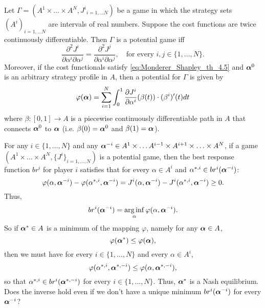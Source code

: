 \begin{theorem}
	Let $\Gamma = (A^1 \times \ldots \times A^N, {J^i}_{i=1,\ldots N})$ be a game in which the strategy sets $(A^i)_{i=1,\ldots N}$ are intervals of real numbers. Suppose the cost functions are twice continuously differentiable. Then $\Gamma$ is a potential game iff
	\begin{equation}
		\frac{\partial^2 J^i}{\partial \alpha^i \partial \alpha^j} =\frac{\partial^2 J^j}{\partial \alpha^i \partial \alpha^j}, \quad \text{for every } i,j \in \{1,\ldots,N\}.
	\label{eq:Monderer_Shapley_th_4.5}
	\end{equation} 
	Moreover, if the cost functionals satisfy \eqref{eq:Monderer_Shapley_th_4.5} and $\boldsymbol{\alpha}^0$ is an arbitrary strategy profile in $A$, then a potential for $\Gamma$ is given by
	\begin{equation}
		\varphi(\boldsymbol{\alpha}) = \sum_{i=1}^N \int_0^1 \frac{\partial J^i}{\partial \alpha^i} (\beta(t)) \cdot (\beta^i)'(t) dt
	\end{equation}
	where $\beta: [0,1] \to A$ is a piecewise continuously differentiable path in $A$ that connects $\boldsymbol{\alpha}^0$ to $\boldsymbol{\alpha}$ (i.e. $\beta(0)=\boldsymbol{\alpha}^0$ and $\beta(1) = \boldsymbol{\alpha}$).\\
\end{theorem}


For any $i \in \{1,\ldots, N\}$ and any $\boldsymbol{\alpha}^{-i} \in  A^{1} \times \ldots A^{i-1} \times A^{i+1} \times \ldots \times A^N$, if a game $( A^{1} \times \ldots \times A^N, \{J^i\}_{i=1,\ldots,N})$ is a potential game, then the best response function $br^i$ for player $i$ satisfies that for every $\alpha \in A^i$ and $\alpha^{*,i} \in br^{i}(\boldsymbol{\alpha}^{-i})$:
\begin{equation}
	\varphi(\alpha, \boldsymbol{\alpha}^{-i}) - \varphi(\alpha^{*,i}, \boldsymbol{\alpha}^{-i}) = J^{i}(\alpha, \boldsymbol{\alpha}^{-i}) - J^i(\alpha^{*,i}, \boldsymbol{\alpha}^{-i}) \geq 0.
\end{equation}
Thus, 
$$
	br^{i}(\boldsymbol{\alpha}^{-i}) = \operatorname*{arg\,inf}_{\alpha} \varphi(\alpha, \boldsymbol{\alpha}^{-i}).
$$
So if $\boldsymbol{\alpha}^* \in A$ is a minimum of the mapping $\varphi$, namely for any $\boldsymbol{\alpha} \in A$,
$$
	\varphi(\boldsymbol{\alpha}^*) \leq \varphi(\boldsymbol{\alpha}),
$$
then we must have for every $i \in \{1,\ldots,N\}$ and every $\alpha \in A^i$,
$$
	\varphi(\alpha^{*,i}, \boldsymbol{\alpha}^{*,-i}) \leq \varphi(\alpha, \boldsymbol{\alpha}^{*,-i}),
$$
so that $\alpha^{*,i} \in br^{i}(\boldsymbol{\alpha}^{*,-i})$ for every $i \in \{1,\ldots,N\}$. Thus, $\boldsymbol{\alpha}^*$ is a Nash equilibrium. {\color{blue} Does the inverse hold even if we don't have a unique minimum $br^i(\boldsymbol{\alpha}^{-i})$ for every $\boldsymbol{\alpha}^{-i}$?}

